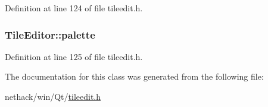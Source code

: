 Definition at line 124 of file tileedit.\+h.

\hypertarget{classTileEditor_a1543fa25129268c56c3ddb52bf5f0715}{
\subsubsection[{palette}]{ Tile\+Editor\+::palette\hspace{0.3cm}{\ttfamily [private]}}}\label{classTileEditor_a1543fa25129268c56c3ddb52bf5f0715}


Definition at line 125 of file tileedit.\+h.



The documentation for this class was generated from the following file\+:\begin{DoxyCompactItemize}
\item 
nethack/win/\+Qt/\hyperlink{tileedit_8h}{tileedit.\+h}\end{DoxyCompactItemize}
